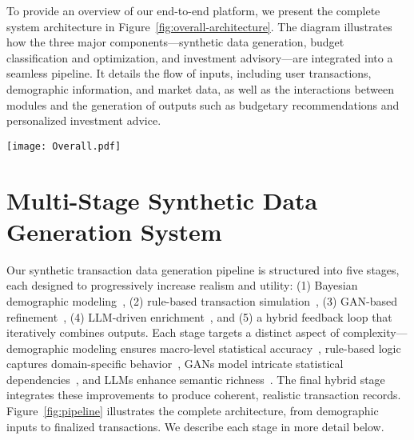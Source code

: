 \documentclass[conference]{IEEEtran}
\begin{document}
To provide an overview of our end-to-end platform, we present the complete system architecture in Figure~\ref{fig:overall-architecture}. The diagram illustrates how the three major components—synthetic data generation, budget classification and optimization, and investment advisory—are integrated into a seamless pipeline. It details the flow of inputs, including user transactions, demographic information, and market data, as well as the interactions between modules and the generation of outputs such as budgetary recommendations and personalized investment advice. 

\begin{figure*}[htbp]
    \centering
    \texttt{[image: Overall.pdf]}

    \caption{System-wide architecture showing the three major components: (1) Synthetic Data Generator, (2) Budget Classification and Optimization Assistant, and (3) LLM-Advisor for Investment Recommendations. This diagram illustrates the flow of data and logic between modules including input sources (market data, user queries, transactions), intermediate analysis modules (sentiment, fundamental, technical), and the delivery of financial recommendations via an interactive user interface.}

        \label{fig:overall-architecture}
\end{figure*}

\section{Multi-Stage Synthetic Data Generation System}
Our synthetic transaction data generation pipeline is structured into five stages, each designed to progressively increase realism and utility: (1) Bayesian demographic modeling~\cite{acsdata}, (2) rule-based transaction simulation~\cite{paysim2016}, (3) GAN-based refinement~\cite{ctgan2019}, (4) LLM-driven enrichment~\cite{brown2020}, and (5) a hybrid feedback loop that iteratively combines outputs. Each stage targets a distinct aspect of complexity—demographic modeling ensures macro-level statistical accuracy~\cite{acsdata}, rule-based logic captures domain-specific behavior~\cite{paysim2016}, GANs model intricate statistical dependencies~\cite{ctgan2019}, and LLMs enhance semantic richness~\cite{brown2020}. The final hybrid stage integrates these improvements to produce coherent, realistic transaction records. Figure~\ref{fig:pipeline} illustrates the complete architecture, from demographic inputs to finalized transactions. We describe each stage in more detail below.
\end{document}
